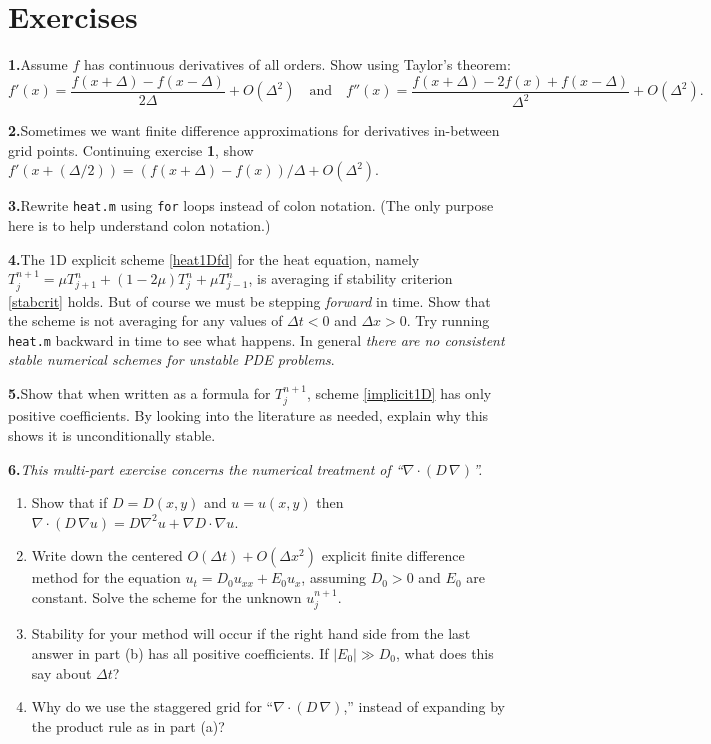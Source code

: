 \documentclass[letterpaper,final,12pt,reqno]{amsart}
\newcommand{\grad}{\nabla}
\newcommand{\Div}{\nabla\cdot}
\begin{document}
\footnotesize




\clearpage\newpage
\small
\section*{Exercises}

\newcommand{\exer}[2]{\medskip\noindent \textbf{#1.}\quad #2}

\exer{1}{Assume $f$ has continuous derivatives of all orders.  Show using Taylor's theorem:
  $$f'(x) = \frac{f(x+\Delta) - f(x-\Delta)}{2\Delta} + O(\Delta^2) \quad \text{and} \quad f''(x) = \frac{f(x+\Delta) - 2 f(x) + f(x-\Delta)}{\Delta^2} + O(\Delta^2).$$}

\exer{2}{Sometimes we want finite difference approximations for derivatives in-between grid points.  Continuing exercise \textbf{1}, show $f'(x+(\Delta/2)) = (f(x+\Delta) - f(x))/\Delta + O(\Delta^2)$.}

\exer{3}{Rewrite \texttt{heat.m} using \texttt{for} loops instead of colon notation.  (The only purpose here is to help understand colon notation.)}

\exer{4}{The 1D explicit scheme \eqref{heat1Dfd} for the heat equation, namely $T_j^{n+1} = \mu T_{j+1}^n + (1 - 2 \mu) T_j^n + \mu T_{j-1}^n$, is averaging if stability criterion \eqref{stabcrit} holds.  But of course we must be stepping \emph{forward} in time.  Show that the scheme is not averaging for any values of $\Delta t < 0$ and $\Delta x > 0$.  Try running \texttt{heat.m} backward in time to see what happens.  In general \emph{there are no consistent stable numerical schemes for unstable PDE problems}.}

\exer{5}{Show that when written as a formula for $T_j^{n+1}$, scheme \eqref{implicit1D} has only positive coefficients.  By looking into the literature as needed, explain why this shows it is unconditionally stable.}

\exer{6}{\emph{This multi-part exercise concerns the numerical treatment of ``$\Div\left(D\,\grad\right)$''.} 
\renewcommand{\labelenumi}{(\alph{enumi})}
\begin{enumerate}
\item Show that if $D=D(x,y)$ and $u=u(x,y)$ then $\Div \left(D\, \grad u\right) = D \grad^2 u + \grad D \cdot \grad u$.
\item Write down the centered $O(\Delta t)+O(\Delta x^2)$ explicit finite difference method for the equation $u_t = D_0 u_{xx} + E_0 u_x$, assuming $D_0>0$ and $E_0$ are constant.  Solve the scheme for the unknown $u_j^{n+1}$. 
\item Stability for your method will occur if the right hand side from the last answer in part (b) has all positive coefficients.  If $|E_0| \gg D_0$, what does this say about $\Delta t$?
\item Why do we use the staggered grid for ``$\Div\left(D\,\grad\right)$,'' instead of expanding by the product rule as in part (a)?
\end{enumerate}
}
\end{document}
